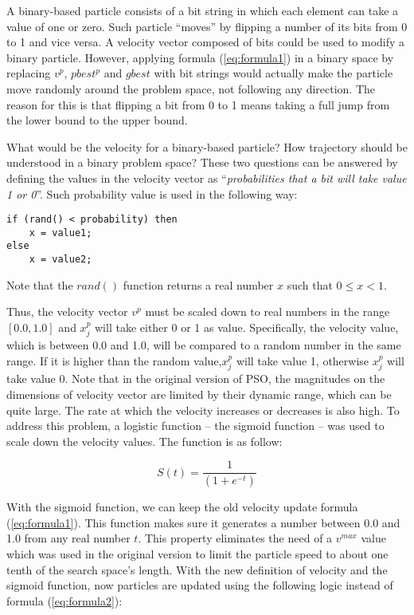 A binary-based particle consists of a bit string in which each element can take a value of one or zero. Such particle ``moves'' by flipping a number of its bits from 0 to 1 and vice versa. A velocity vector composed of bits could be used to modify a binary particle. However, applying formula (\ref{eq:formula1}) in a binary space by replacing $v^p$, $pbest^p$ and $gbest$ with bit strings would actually make the particle move randomly around the problem space, not following any direction. The reason for this is that flipping a bit from 0 to 1 means taking a full jump from the lower bound to the upper bound.

What would be the velocity for a binary-based particle? How trajectory should be understood in a binary problem space? These two questions can be answered by defining the values in the velocity vector as ``\emph{probabilities that a bit will take value 1 or 0}''. Such probability value is used in the following way:

\begin{verbatim}
if (rand() < probability) then
    x = value1;
else
    x = value2;
\end{verbatim}

Note that the $rand()$ function returns a real number $x$ such that $ 0 \leq x < 1$.

Thus, the velocity vector $v^p$ must be scaled down to real numbers in the range $[0.0, 1.0]$ and $x_j^p$ will take either 0 or 1 as value. Specifically, the velocity value, which is between 0.0 and 1.0, will be compared to a random number in the same range. If it is higher than the random value,$x_j^p$ will take value 1, otherwise $x_j^p$ will take value 0. Note that in the original version of PSO, the magnitudes on the dimensions of velocity vector are limited by their dynamic range, which can be quite large. The rate at which the velocity increases or decreases is also high. To address this problem, a logistic function -- the sigmoid function -- was used to scale down the velocity values. The function is as follow:

\begin{equation} \label{eq:formula3}
S(t) = \frac{1}{(1 + e^{-t})}
\end{equation}

With the sigmoid function, we can keep the old velocity update formula (\ref{eq:formula1}). This function makes sure it generates a number between 0.0 and 1.0 from any real number $t$. This property eliminates the need of a $v^{max}$ value which was used in the original version to limit the particle speed to about one tenth of the search space's length. With the new definition of velocity and the sigmoid function, now particles are updated using the following logic instead of formula (\ref{eq:formula2}):

